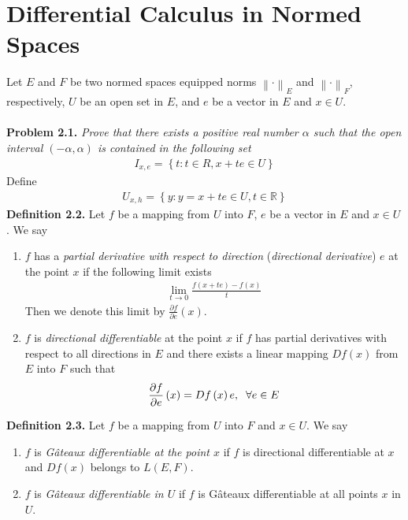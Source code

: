 \documentclass[a4paper]{article}
\numberwithin{equation}{section}
\begin{document}
\section{Differential Calculus in Normed Spaces}
Let $E$ and $F$ be two normed spaces equipped norms ${\left\|  \cdot  \right\|_E}$ and ${\left\|  \cdot  \right\|_F}$, respectively, $U$ be an open set in $E$, and $e$ be a vector in $E$ and $x\in U$.\\
\\
\textbf{Problem 2.1.} \textit{Prove that there exists a positive real number $\alpha$ such that the open interval $\left(-\alpha,\alpha\right)$ is contained in the following set}
\begin{align}
{I_{x,e}} = \left\{ {t:t \in R,x + te \in U} \right\}
\end{align}
Define
\begin{align}
{U_{x,h}} = \left\{ {y:y = x + te \in U,t \in \mathbb{R}} \right\}
\end{align}
\textbf{Definition 2.2.} Let $f$ be a mapping from $U$ into $F$, $e$ be a vector in $E$ and $x\in U$. We say
\begin{enumerate}
\item $f$ has a \textit{partial derivative with respect to direction} (\textit{directional derivative}) $e$ at the point $x$ if the following limit exists
\begin{align}
\mathop {\lim }\limits_{t \to 0} \frac{{f\left( {x + te} \right) - f\left( x \right)}}{t}
\end{align}
Then we denote this limit by $\frac{{\partial f}}{{\partial e}}\left( x \right)$.
\item $f$ is \textit{directional differentiable} at the point $x$ if $f$ has partial derivatives with respect to all directions in $E$ and there exists a linear mapping $Df\left(x\right)$ from $E$ into $F$ such that
\begin{align}
\frac{{\partial f}}{{\partial e}}\left( x \right) = Df\left( x \right)e,\hspace{0.2cm}\forall e \in E
\end{align}
\end{enumerate}
\textbf{Definition 2.3.} Let $f$ be a mapping from $U$ into $F$ and $x\in U$. We say
\begin{enumerate}
\item $f$ is \textit{G\^{a}teaux differentiable at the point $x$} if $f$ is directional differentiable at $x$ and $Df\left(x\right)$ belongs to $L\left(E,F\right)$.
\item $f$ is \textit{G\^{a}teaux differentiable in $U$} if $f$ is G\^{a}teaux differentiable at all points $x$ in $U$.
\end{enumerate}
\end{document}
